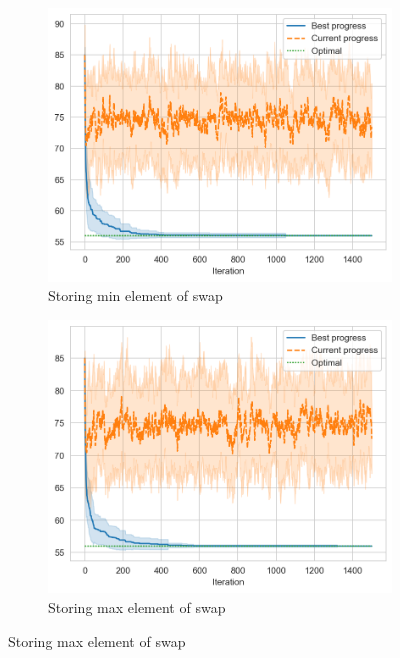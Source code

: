\begin{figure}[ht]
    \centering
    \hfill
    \begin{subfigure}{0.45\textwidth}
        \includegraphics[width=\textwidth]{../images/p3/store-min.png}
        \caption{Storing min element of swap}
    \end{subfigure}
    \hfill
    \begin{subfigure}{0.45\textwidth}
        \includegraphics[width=\textwidth]{../images/p3/store-max.png}
        \caption{Storing max element of swap}
    \end{subfigure}
    \hfill


\end{figure}
